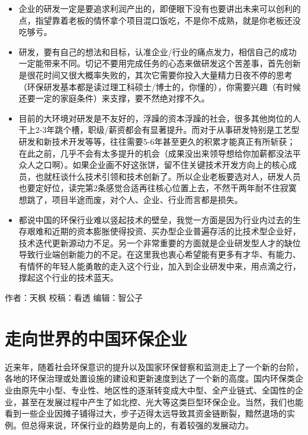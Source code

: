 \documentclass[]{book}
\begin{document}
\begin{itemize}
\item
  企业的研发一定是要追求利润产出的，即便眼下没有也要讲出未来可以创利的点，指望靠着老板的情怀拿个项目混口饭吃，不是你不成熟，就是你老板还没吃够亏。
\item
  研发，要有自己的想法和目标，认准企业/行业的痛点发力，相信自己的成功一定能带来不同。切记不要用完成任务的心态来做研发这个苦差事，首先创新是很花时间又很大概率失败的，其次它需要你投入大量精力日夜不停的思考（环保研发基本都是读过理工科硕士/博士的，你懂的），你需要兴趣（有时候还要一定的家庭条件）来支撑，要不然绝对撑不久。
\item
  目前的大环境对研发是不友好的，浮躁的资本浮躁的社会，很多其他岗位的人干上2-3年跳个槽，职级/薪资都会有显著提升。而对于从事研发特别是工艺型研发和新技术开发等等，往往需要5-6年甚至更久的积累才能真正有所斩获；在此之前，几乎不会有太多提升的机会（成果没出来领导想给你加薪都没法平众人之口啊）。如果企业画不好这张饼，留不住关键技术开发方向上的核心成员，也就枉谈什么技术引领和技术创新了。所以企业老板要选对人，研发人员也要定好位，读完第2条感觉合适再往核心位置上去，不然干两年耐不住寂寞想跳了，项目半途而废，对个人、企业、行业而言都是损失。
\item
  都说中国的环保行业难以竖起技术的壁垒，我觉一方面是因为行业内过去的生存艰难和近期的资本膨胀使得投资、买办型企业普遍存活的比技术型企业好，技术迭代更新源动力不足。另一个非常重要的方面就是企业研发型人才的缺位导致行业端创新能力的不足。在这里我也衷心希望能有更多有才华、有能力、有情怀的年轻人能勇敢的走入这个行业，加入到企业研发中来，用点滴之行，撑起这个行业的技术蓝天。
\end{itemize}

作者：天枫
校稿：看透
编辑：智公子

\hypertarget{ux8d70ux5411ux4e16ux754cux7684ux4e2dux56fdux73afux4fddux4f01ux4e1a}{%
\section{走向世界的中国环保企业}\label{ux8d70ux5411ux4e16ux754cux7684ux4e2dux56fdux73afux4fddux4f01ux4e1a}}

近来年，随着社会环保意识的提升以及国家环保督察和监测走上了一个新的台阶，各地的环保治理或处置设施的建设和更新速度到达了一个新的高度。国内环保类企业由原先中小型、专业性、地区性的逐渐转变成大中型、全产业链式、全国性的企业，甚至在发展过程中产生了如北控、光大等这类巨型环保企业。当然，我们也能看到一些企业因摊子铺得过大，步子迈得太远导致其资金链断裂，黯然退场的实例。但总得来说，环保行业的趋势是向上的，有着较强的发展动力。
\end{document}
